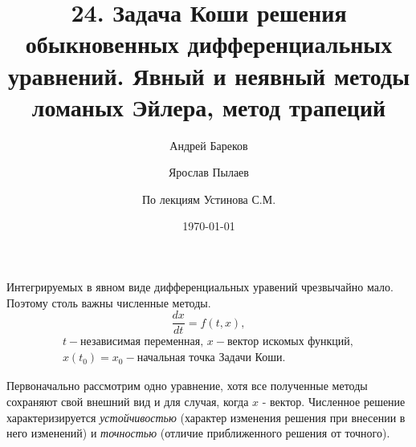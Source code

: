 \documentclass[a4paper,11pt]{article}
\title{24. Задача Коши решения обыкновенных дифференциальных уравнений. Явный и неявный методы ломаных Эйлера, метод трапеций}
\author{Андрей Бареков \and Ярослав Пылаев \and По лекциям Устинова С.М.}
\date{\today}
\begin{document}
\maketitle
\newpage

\noindent Интегрируемых в явном виде дифференциальных уравений чрезвычайно мало. Поэтому столь важны численные методы. \\

\begin{equation}
  \frac{dx}{dt} = f(t, x),
  \label{eq:LDLE}
\end{equation}
\begin{gather*}
  t - \text{независимая переменная}, \, x - \text{вектор искомых функций}, \\
  x(t_0) = x_0 - \text{начальная точка Задачи Коши}.
\end{gather*}

\noindent Первоначально рассмотрим одно уравнение, хотя все полученные методы сохраняют свой внешний вид и для случая, когда $x$ - вектор.
Численное решение характеризируется \textit{устойчивостью} (характер изменения решения при внесении в него изменений) и
\textit{точностью} (отличие приближенного решения от точного). \\
\end{document}
